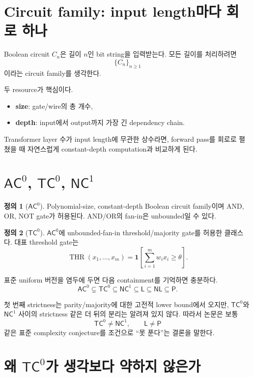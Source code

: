 \documentclass[11pt,a4paper,oneside,openany]{memoir}
\newcommand{\one}{\mathbf{1}}
\theoremstyle{definition}
\newtheorem{definition}{정의}[chapter]
\newcommand{\AC}{\mathsf{AC}}
\newcommand{\TC}{\mathsf{TC}}
\newcommand{\NC}{\mathsf{NC}}
\newcommand{\Lclass}{\mathsf{L}}
\newcommand{\NL}{\mathsf{NL}}
\newcommand{\Pclass}{\mathsf{P}}
\begin{document}
\section{Circuit family: input length마다 회로 하나}

Boolean circuit $C_n$은 길이 $n$인 bit string을 입력받는다. 모든 길이를 처리하려면
\[
\{C_n\}_{n\ge 1}
\]
이라는 circuit family를 생각한다.

두 resource가 핵심이다.
\begin{itemize}
  \item \textbf{size}: gate/wire의 총 개수,
  \item \textbf{depth}: input에서 output까지 가장 긴 dependency chain.
\end{itemize}

Transformer layer 수가 input length에 무관한 상수라면, forward pass를 회로로 펼쳤을 때 자연스럽게 constant-depth computation과 비교하게 된다.

\section{\texorpdfstring{$\AC^0$, $\TC^0$, $\NC^1$}{AC0, TC0, NC1}}

\begin{definition}[$\AC^0$]
Polynomial-size, constant-depth Boolean circuit family이며 AND, OR, NOT gate가 허용된다.
AND/OR의 fan-in은 unbounded일 수 있다.
\end{definition}

\begin{definition}[$\TC^0$]
$\AC^0$에 unbounded-fan-in threshold/majority gate를 허용한 클래스다. 대표 threshold gate는
\[
\operatorname{THR}(x_1,\dots,x_m)
=
\one\!\left[\sum_{i=1}^{m}w_i x_i\ge \theta\right].
\]
\end{definition}

표준 uniform 버전을 염두에 두면 다음 containment를 기억하면 충분하다.
\[
\AC^0\subsetneq \TC^0\subseteq \NC^1\subseteq \Lclass\subseteq \NL\subseteq \Pclass.
\]

첫 번째 strictness는 parity/majority에 대한 고전적 lower bound에서 오지만,
$\TC^0$와 $\NC^1$ 사이의 strictness 같은 더 뒤의 분리는 알려져 있지 않다.
따라서 논문은 보통
\[
\TC^0\neq \NC^1,\qquad \Lclass\neq\Pclass
\]
같은 표준 complexity conjecture를 조건으로 ``못 푼다''는 결론을 말한다.

\section{\texorpdfstring{왜 $\TC^0$가 생각보다 약하지 않은가}{왜 TC0가 생각보다 약하지 않은가}}
\end{document}
